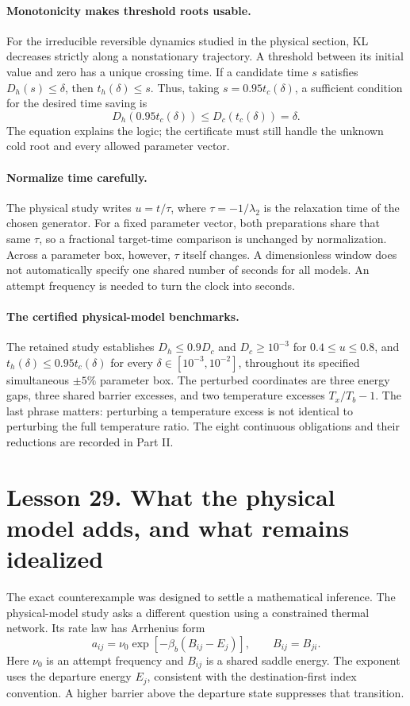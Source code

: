 \paragraph{Monotonicity makes threshold roots usable.}
For the irreducible reversible dynamics studied in the physical section,
KL decreases strictly along a nonstationary trajectory. A threshold between
its initial value and zero has a unique crossing time. If a candidate time
$s$ satisfies $D_h(s)\leq\delta$, then $t_h(\delta)\leq s$.
Thus, taking $s=0.95t_c(\delta)$, a sufficient condition for the desired
time saving is
\[
D_h(0.95t_c(\delta))\leq D_c(t_c(\delta))=\delta.
\]
The equation explains the logic; the certificate must still handle the
unknown cold root and every allowed parameter vector.

\paragraph{Normalize time carefully.}
The physical study writes $u=t/\tau$, where
$\tau=-1/\lambda_2$ is the relaxation time of the chosen generator.
For a fixed parameter vector, both preparations share that same $\tau$,
so a fractional target-time comparison is unchanged by normalization.
Across a parameter box, however, $\tau$ itself changes. A dimensionless
window does not automatically specify one shared number of seconds for
all models. An attempt frequency is needed to turn the clock into seconds.

\paragraph{The certified physical-model benchmarks.}
The retained study establishes $D_h\leq0.9D_c$ and $D_c\geq10^{-3}$ for
$0.4\leq u\leq0.8$, and $t_h(\delta)\leq0.95t_c(\delta)$ for every
$\delta\in[10^{-3},10^{-2}]$, throughout its specified simultaneous
$\pm5\%$ parameter box. The perturbed coordinates are three energy gaps,
three shared barrier excesses, and two temperature excesses $T_x/T_b-1$.
The last phrase matters: perturbing a temperature excess is not identical
to perturbing the full temperature ratio. The eight continuous obligations
and their reductions are recorded in Part II.

\clearpage
\section*{Lesson 29. What the physical model adds, and what remains idealized}
The exact counterexample was designed to settle a mathematical inference.
The physical-model study asks a different question using a constrained
thermal network. Its rate law has Arrhenius form
\[
a_{ij}=\nu_0\exp[-\beta_b(B_{ij}-E_j)],\qquad B_{ij}=B_{ji}.
\]
Here $\nu_0$ is an attempt frequency and $B_{ij}$ is a shared saddle energy.
The exponent uses the departure energy $E_j$, consistent with the
 destination-first index convention. A higher barrier above the departure
state suppresses that transition.

